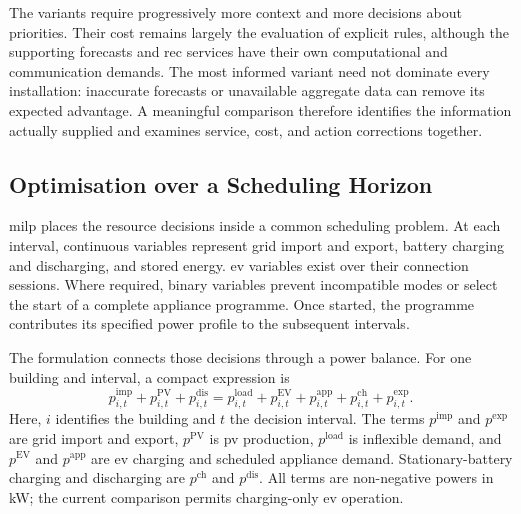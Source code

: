 The variants require progressively more context and more decisions about priorities. Their cost remains largely the evaluation of explicit rules, although the supporting forecasts and \gls{rec} services have their own computational and communication demands. The most informed variant need not dominate every installation: inaccurate forecasts or unavailable aggregate data can remove its expected advantage. A meaningful comparison therefore identifies the information actually supplied and examines service, cost, and action corrections together.

\subsection{Optimisation over a Scheduling Horizon}
\label{sec:milp-control}

\gls{milp} places the resource decisions inside a common scheduling problem. At each interval, continuous variables represent grid import and export, battery charging and discharging, and stored energy. \gls{ev} variables exist over their connection sessions. Where required, binary variables prevent incompatible modes or select the start of a complete appliance programme. Once started, the programme contributes its specified power profile to the subsequent intervals.

\begin{samepage}
The formulation connects those decisions through a power balance. For one building and interval, a compact expression is
\begin{equation}
 p^{\mathrm{imp}}_{i,t}+p^{\mathrm{PV}}_{i,t}+p^{\mathrm{dis}}_{i,t}
 =p^{\mathrm{load}}_{i,t}+p^{\mathrm{EV}}_{i,t}+p^{\mathrm{app}}_{i,t}
 +p^{\mathrm{ch}}_{i,t}+p^{\mathrm{exp}}_{i,t}.
 \label{eq:control-milp-balance}
\end{equation}
Here, $i$ identifies the building and $t$ the decision interval. The terms $p^{\mathrm{imp}}$ and $p^{\mathrm{exp}}$ are grid import and export, $p^{\mathrm{PV}}$ is \gls{pv} production, $p^{\mathrm{load}}$ is inflexible demand, and $p^{\mathrm{EV}}$ and $p^{\mathrm{app}}$ are \gls{ev} charging and scheduled appliance demand. Stationary-battery charging and discharging are $p^{\mathrm{ch}}$ and $p^{\mathrm{dis}}$. All terms are non-negative powers in kW; the current comparison permits charging-only \gls{ev} operation.
\end{samepage}

